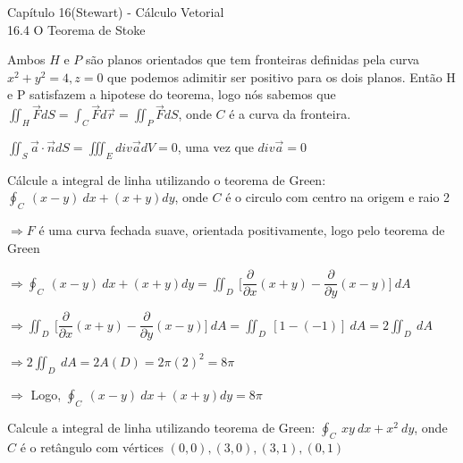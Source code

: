 \documentclass[11pt,a4paper]{article}
\begin{document}
\begin{enumerate}
{	\begin{center}
	    \begin{large}Capítulo 16(Stewart) - Cálculo Vetorial\\16.4 O Teorema de Stoke
	    \end{large}
	\end{center}
	
	    \item Ambos $H$ e $P$ são planos orientados que tem fronteiras definidas pela curva $x^2 + y^2 = 4, z=0$ que podemos adimitir ser positivo para os dois planos. Então H e P satisfazem a hipotese do teorema, logo nós sabemos que $\iint_H \vec{F}dS = \int_C \vec{F}d\vec{r} = \iint_P \vec{F}dS $, onde $C$ é a curva da fronteira.
	    \item [25] $\iint_S \vec{a} \cdot \vec{n} dS = \iiint_E div\vec{a} dV = 0$, uma vez que $div\vec{a} = 0$

	
	
		
		\item Cálcule a integral de linha utilizando o teorema de Green: $\displaystyle\oint_C\ (x - y)\ dx + (x + y)dy$, onde $C$ é o circulo com centro na origem e raio 2
		
		$\Rightarrow F$ é uma curva fechada suave, orientada positivamente, logo pelo teorema de Green
		
		$\Rightarrow \displaystyle\oint_C\ (x - y)\ dx + (x + y)dy = \displaystyle\iint_D\ \Bigg[\dfrac{\partial}{\partial x}(x + y) - \dfrac{\partial}{\partial y}(x - y) \Bigg]\ dA$ 
		
		$\Rightarrow \displaystyle\iint_D\ \Bigg[\dfrac{\partial}{\partial x}(x + y) - \dfrac{\partial}{\partial y}(x - y) \Bigg]\ dA = \displaystyle\iint_D\ [1 - (-1)]\ dA = 2\displaystyle\iint_D\ dA $
		
		$\Rightarrow 2\displaystyle\iint_D\ dA = 2A(D) = 2\pi(2)^2 = 8\pi$
		
		$\Rightarrow$ Logo, $\displaystyle\oint_C\ (x - y)\ dx + (x + y)dy = 8\pi$
		
		\item Calcule a integral de linha utilizando teorema de Green: $\displaystyle\oint_C\ xy\ dx + x^2\ dy $, onde $C$ é o retângulo com vértices $(0,0),(3,0),(3,1),(0,1)$
		
}
\end{enumerate}
\end{document}
